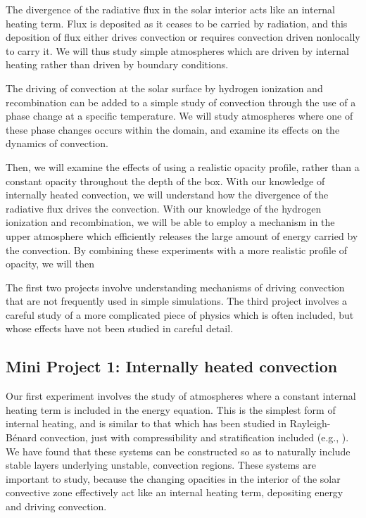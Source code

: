 \documentclass[aasms,12pt]{article}
\newcommand{\RB}{Rayleigh-B\'{e}nard }
\begin{document}
The divergence of the radiative flux in the solar interior acts like an
internal heating term.  Flux is deposited as it ceases to be carried by radiation, and this
deposition of flux either drives convection or requires convection driven nonlocally to carry
it.  We will thus study simple atmospheres which are driven by internal heating rather than
driven by boundary conditions.

The driving of convection at the solar surface by hydrogen ionization and recombination can
be added to a simple study of convection through the use of a phase change at a specific temperature.
We will study atmospheres where one of these phase changes occurs within the domain, and
examine its effects on the dynamics of convection.

Then, we will examine the effects of using a realistic opacity profile, rather than a constant
opacity throughout the depth of the box.  With our knowledge of internally heated convection,
we will understand how the divergence of the radiative flux drives the convection.  With our
knowledge of the hydrogen ionization and recombination, we will be able to employ a mechanism in the
upper atmosphere which efficiently releases the large amount of energy carried by the convection.
By combining these experiments with a more realistic profile of opacity, we will then

The first two projects involve understanding mechanisms of driving convection that are not
frequently used in simple simulations.  The third project involves a careful study of a
more complicated piece of physics which is often included, but whose effects have not
been studied in careful detail.

\subsection{Mini Project 1: Internally heated convection}
Our first experiment involves the study of atmospheres where a constant internal heating
term is included in the energy equation.  This is the simplest form of internal heating,
and is similar to that which has been studied in \RB convection, just with compressibility
and stratification included (e.g., \cite{goluskin&spiegel2012}).  
We have found that these systems can be constructed so as to
naturally include stable layers underlying unstable, convection regions.  These systems
are important to study, because the changing opacities in the interior of the solar convective
zone effectively act like an internal heating term, depositing energy and driving convection.
\end{document}
